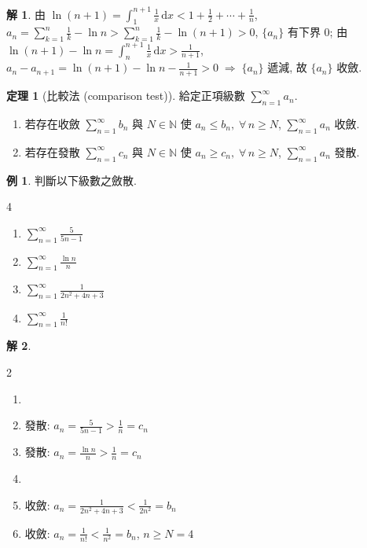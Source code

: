 \documentclass[12pt]{extarticle}
\newcommand{\ds}{\displaystyle}
\newcommand{\ie}{\;\Longrightarrow\;}
\theoremstyle{definition}
\newtheorem*{thm}{定理}
\newtheorem*{ex}{例}
\newtheorem*{sol}{解}
\begin{document}
\begin{sol}
  由 $\ds\ln(n + 1) = \int_1^{n + 1}\frac{1}{x}\,\text{d}x < 1 + \frac{1}{2} + \cdots + \frac{1}{n}$, $\ds a_n = \sum_{k = 1}^n\frac{1}{k} - \ln n > \sum_{k = 1}^n\frac{1}{k} - \ln(n + 1) > 0$, $\{a_n\}$ 有下界 $0$; 由 $\ds\ln(n + 1) - \ln n = \int_n^{n + 1}\frac{1}{x}\,\text{d}x > \frac{1}{n + 1}$, $\ds a_n - a_{n + 1} = \ln(n + 1) - \ln n - \frac{1}{n + 1} > 0 \ie \{a_n\}$ 遞減, 故 $\{a_n\}$ 收斂. 
\end{sol}

\begin{thm}[比較法 (comparison test)]
  給定正項級數 $\ds\sum_{n = 1}^\infty a_n$. 
  \begin{enumerate}\setlength{\itemsep}{0pt}
    \item 若存在收斂 $\ds\sum_{n = 1}^\infty b_n$ 與 $N\in\mathbb{N}$ 使 $\ds a_n\leqslant b_n,\;\forall\,n\geqslant N$, $\ds\sum_{n = 1}^\infty a_n$ 收斂. 
    \item 若存在發散 $\ds\sum_{n = 1}^\infty c_n$ 與 $N\in\mathbb{N}$ 使 $\ds a_n\geqslant c_n,\;\forall\,n\geqslant N$, $\ds\sum_{n = 1}^\infty a_n$ 發散. 
  \end{enumerate}
\end{thm}

\begin{ex} 判斷以下級數之斂散. 
  \begin{multicols}{4}
    \begin{enumerate}\setlength{\itemsep}{0pt}
      \item $\ds\sum_{n = 1}^\infty\frac{5}{5 n - 1}$
      \item $\ds\sum_{n = 1}^\infty\frac{\ln n}{n}$
      \item $\ds\sum_{n = 1}^\infty\frac{1}{2n^2 + 4n + 3}$
      \item $\ds\sum_{n = 1}^\infty\frac{1}{n!}$
    \end{enumerate}
  \end{multicols}
\end{ex}

\begin{sol}
  \begin{multicols}{2}
    \begin{enumerate}\setlength{\itemsep}{0pt}
      \item[]
      \item 發散: $\ds a_n = \frac{5}{5 n - 1} > \frac{1}{n} = c_n$
      \item 發散: $\ds a_n = \frac{\ln n}{n} > \frac{1}{n} = c_n$
      \item[]
      \item 收斂: $\ds a_n = \frac{1}{2n^2 + 4n + 3} < \frac{1}{2n^2} = b_n$
      \item 收斂: $\ds a_n = \frac{1}{n!} < \frac{1}{n^2} = b_n$, $n\geqslant N = 4$
    \end{enumerate}
  \end{multicols}
\end{sol}
\end{document}
